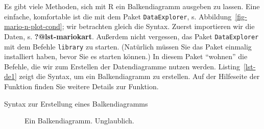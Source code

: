 \documentclass[
  letterpaper,
  oneside,
  open=any]{scrbook}
\newenvironment{Shaded}{\begin{snugshade}}{\end{snugshade}}
\newcommand{\FunctionTok}[1]{\textcolor[rgb]{0.28,0.35,0.67}{#1}}
\newcommand{\NormalTok}[1]{\textcolor[rgb]{0.00,0.23,0.31}{#1}}
\newcommand{\SpecialCharTok}[1]{\textcolor[rgb]{0.37,0.37,0.37}{#1}}
\theoremstyle{definition}
\theoremstyle{definition}
\theoremstyle{definition}
\theoremstyle{remark}
\begin{document}
Es gibt viele Methoden, sich mit R ein Balkendiagramm ausgeben zu
lassen. Eine einfache, komfortable ist die mit dem Paket
\texttt{DataExplorer}, s. Abbildung~\ref{fig-mario-n-plot-cond}; wir
betrachten gleich die Syntax. Zuerst importieren wir die Daten, s.
\textbf{?@lst-mariokart}. Außerdem nicht vergessen, das Paket
\texttt{DataExplorer} mit dem Befehle \texttt{library} zu starten.
(Natürlich müssen Sie das Paket einmalig installiert haben, bevor Sie es
starten können.) In diesem Paket \enquote{wohnen} die Befehle, die wir
zum Erstellen der Datendiagramme nutzen werden. Listing~\ref{lst-de1}
zeigt die Syntax, um ein Balkendiagramm zu erstellen. Auf der Hilfeseite
der Funktion finden Sie weitere Details zur Funktion.

\begin{codelisting}

\caption{\label{lst-de1}Syntax zur Erstellung eines Balkendiagramms}

\centering{

\begin{Shaded}
\begin{Highlighting}[]
\FunctionTok{library}\NormalTok{(DataExplorer)}

\NormalTok{mariokart }\SpecialCharTok{\%\textgreater{}\%} 
  \FunctionTok{select}\NormalTok{(cond) }\SpecialCharTok{\%\textgreater{}\%} 
  \FunctionTok{plot\_bar}\NormalTok{()}
\end{Highlighting}
\end{Shaded}

}

\end{codelisting}%

\begin{figure}[H]


\caption{\label{fig-de1}Ein Balkendiagramm. Unglaublich.}

\end{figure}%
\end{document}
